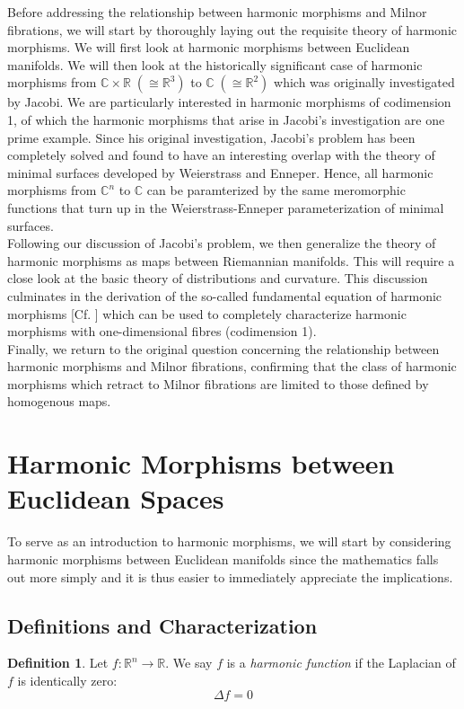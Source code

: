 \documentclass[12pt]{article}
\theoremstyle{definition}
\newtheorem{definition}{Definition}[section]
\numberwithin{equation}{subsection}
\begin{document}
Before addressing the relationship between harmonic morphisms and Milnor fibrations, we will start by thoroughly laying out the requisite theory of harmonic morphisms. We will first look at harmonic morphisms between Euclidean manifolds. We will then look at the historically significant case of harmonic morphisms from $\mathbb{C} \times \mathbb{R} \; (\cong \mathbb{R}^3)$ to $\mathbb{C} \; (\cong \mathbb{R}^2)$ which was originally investigated by Jacobi. We are particularly interested in harmonic morphisms of codimension 1, of which the harmonic morphisms that arise in Jacobi's investigation are one prime example. Since his original investigation, Jacobi's problem has been completely solved and found to have an interesting overlap with the theory of minimal surfaces developed by Weierstrass and Enneper. Hence, all harmonic morphisms from $\mathbb{C}^n$ to $\mathbb{C}$ can be paramterized by the same meromorphic functions that turn up in the Weierstrass-Enneper parameterization of minimal surfaces.\\
\indent Following our discussion of Jacobi's problem, we then generalize the theory of harmonic morphisms as maps between Riemannian manifolds. This will require a close look at the basic theory of distributions and curvature. This discussion culminates in the derivation of the so-called fundamental equation of harmonic morphisms [Cf. \cite{BairdWood}] which can be used to completely characterize harmonic morphisms with one-dimensional fibres (codimension 1).\\
\indent Finally, we return to the original question concerning the relationship between harmonic morphisms and Milnor fibrations, confirming that the class of harmonic morphisms which retract to Milnor fibrations are limited to those defined by homogenous maps. 

\section{Harmonic Morphisms between Euclidean Spaces} \label{Sec: EuclHM}
 To serve as an introduction to harmonic morphisms, we will start by considering harmonic morphisms between Euclidean manifolds since the mathematics falls out more simply and it is thus easier to immediately appreciate the implications. 
 
 \subsection{Definitions and Characterization}
 \begin{definition}
Let $f: \mathbb{R}^n \rightarrow \mathbb{R}$. We say $f$ is a \textit{harmonic function} if the Laplacian of $f$ is identically zero:
$$
\Delta f = 0
$$
\end{definition}
\end{document}
